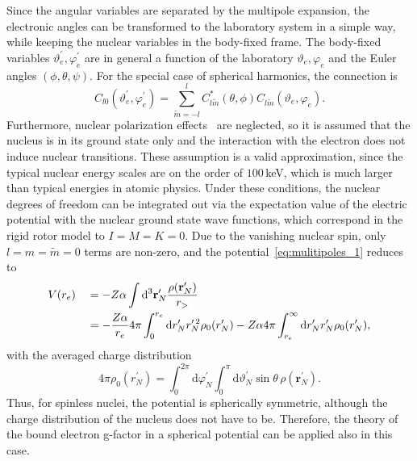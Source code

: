 Since the angular variables are separated by the multipole expansion, the electronic angles can be transformed to the laboratory system in a simple way, while keeping the nuclear variables in the body-fixed frame. The body-fixed variables $\vartheta^{\prime}_e,\varphi^\prime_e$ are in general a function of the laboratory $\vartheta_e,\varphi_e$ and the Euler angles $(\phi,\theta,\psi)$. For the special case of spherical harmonics, the connection is
\begin{equation}
C_{l0}(\vartheta_e^\prime,\varphi_e^\prime) = \sum_{\tilde{m}=-l}^l C^{*}_{l\tilde{m}}(\theta,\phi)C_{l\tilde{m}}(\vartheta_e,\varphi_e).
\end{equation}
Furthermore, nuclear polarization effects~\cite{Nefiodov} are neglected, so it is assumed that the nucleus is in its ground state only and the interaction with the electron does not induce nuclear transitions. These assumption is a valid approximation, since the typical nuclear energy scales are on the order of $100\,$keV, which is much larger than typical energies in atomic physics. Under these conditions, the nuclear degrees of freedom can be integrated out via the expectation value of the electric potential with the nuclear ground state wave functions, which correspond in the rigid rotor model to $I=M=K=0$. Due to the vanishing nuclear spin, only $l=m=\tilde{m}=0$ terms are non-zero, and the potential~\eqref{eq:mulitipoles_1} reduces to
\begin{alignat}{2}
\label{eq:gfac_monopole}
&V(r_e)&&=-Z\alpha \int\mathrm{d}^3\mathbf{r}^\prime_N\frac{\rho(\mathbf{r}_N^\prime)}{r_>}\\
& &&= -\frac{Z\alpha}{r_e} 4\pi\int_0^{r_e}\mathrm{d}r_N^\prime r_N^{\prime\,2}\rho_0(r_N^\prime) 
-Z\alpha 4\pi\int_{r_e}^\infty\mathrm{d}r_N^\prime r_N^{\prime}\rho_0(r_N^\prime), \notag
\end{alignat}
with the averaged charge distribution
\begin{equation}
\label{eq:rho_averaged}
4\pi\rho_0(r^\prime_N)=\int_0^{2\pi}\mathrm{d}\varphi_N^\prime \int_0^\pi \mathrm{d}\vartheta_N^\prime \sin\theta\,\rho(\mathbf{r}_N^\prime).
\end{equation}
Thus, for spinless nuclei, the potential is spherically symmetric, although the charge distribution of the nucleus does not have to be. Therefore, the theory of the bound electron g-factor in a spherical potential can be applied also in this case.

